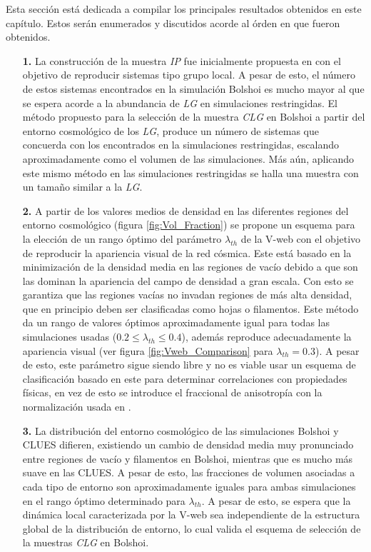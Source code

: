 Esta sección está dedicada a compilar los principales resultados obtenidos
en este capítulo. Estos serán enumerados y discutidos acorde al órden en
que fueron obtenidos.


\begin{enumerate}
\item[\textbf{1.}] La construcción de la muestra \textit{IP} fue 
inicialmente propuesta en \cite{forero2011} con el objetivo de reproducir
sistemas tipo grupo local. A pesar de esto, el número de estos sistemas 
encontrados en la simulación Bolshoi es mucho mayor al que se espera acorde
a la abundancia de \textit{LG} en simulaciones restringidas. El método 
propuesto para la selección de la muestra \textit{CLG} en Bolshoi a partir 
del entorno cosmológico de los \textit{LG}, produce un número de sistemas 
que concuerda con los encontrados en la simulaciones restringidas, escalando 
apro\-ximadamente como el volumen de las simulaciones. Más aún, aplicando 
este mismo método en las simulaciones restringidas se halla una muestra
con un tamaño similar a la \textit{LG}.


\item[\textbf{2.}] A partir de los valores medios de densidad en las 
diferentes regiones del entorno cosmológico (figura \ref{fig:Vol_Fraction})
se propone un esquema para la elección de un rango óptimo del parámetro
$\lambda_{th}$ de la V-web con el objetivo de reproducir la 
apariencia visual de la red cósmica. Este está basado en la 
minimización de la densidad media en las regiones de vacío debido a que
son las dominan la apariencia del campo de densidad a gran escala. Con
esto se garantiza que las regiones vacías no invadan regiones de más alta
densidad, que en principio deben ser clasificadas como hojas o filamentos.
Este método da un rango de valores óptimos aproximadamente igual para 
todas las simulaciones usadas ($0.2 \leq \lambda_{th} \leq 0.4$), además
reproduce adecuadamente la apariencia visual (ver figura 
\ref{fig:Vweb_Comparison} para $\lambda_{th} = 0.3$). A pesar de esto, 
este parámetro sigue siendo libre y no es viable usar un esquema de 
clasificación basado en este para determinar correlaciones con propiedades
físicas, en vez de esto se introduce el fraccional de anisotropía 
con la normalización usada en \cite{libeskind2013}.


\item[\textbf{3.}] La distribución del entorno cosmológico de las 
simulaciones Bolshoi y CLUES difieren, existiendo un cambio de densidad 
media muy pronunciado entre regiones de vacío y filamentos en Bolshoi, 
mientras que es mucho más suave en las CLUES. A pesar de esto, las 
fracciones de volumen asociadas a cada tipo de entorno son aproximadamente 
iguales para ambas simulaciones en el rango óptimo determinado para 
$\lambda_{th}$. A pesar de esto, se espera que la dinámica local 
caracterizada por la V-web sea independiente de la estructura global 
de la distribución de entorno, lo cual valida el esquema de selección 
de la muestras \textit{CLG} en Bolshoi.



\end{enumerate}
